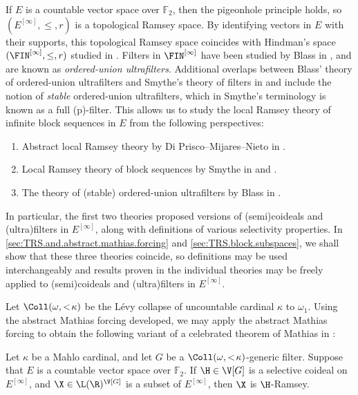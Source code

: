 \documentclass[11pt,reqno]{amsart}
\begin{document}
If $E$ is a countable vector space over $\mathbb{F}_2$, then the pigeonhole principle holds, so $(E^{[\infty]},\leq,r)$ is a topological Ramsey space. By identifying vectors in $E$ with their supports, this topological Ramsey space coincides with Hindman's space $(\FIN^{[\infty]},\leq,r)$ studied in \cite{B87}. Filters in $\FIN^{[\infty]}$ have been studied by Blass in \cite{B87}, and are known as \emph{ordered-union ultrafilters}. Additional overlaps between Blass' theory of ordered-union ultrafilters and Smythe's theory of filters in \cite{S18} and \cite{S23} include the notion of \emph{stable} ordered-union ultrafilters, which in Smythe's terminology is known as a full (p)-filter. This allows us to study the local Ramsey theory of infinite block sequences in $E$ from the following perspectives:
\begin{enumerate}
    \item Abstract local Ramsey theory by Di Prisco--Mijares--Nieto in \cite{DMN15}.
    
    \item Local Ramsey theory of block sequences by Smythe in \cite{S18} and \cite{S23}.
    
    \item The theory of (stable) ordered-union ultrafilters by Blass in \cite{B87}.
\end{enumerate}
In particular, the first two theories proposed versions of (semi)coideals and (ultra)filters in $E^{[\infty]}$, along with definitions of various selectivity properties. In \Sec\ref{sec:TRS.and.abstract.mathias.forcing} and \Sec\ref{sec:TRS.block.subspaces}, we shall show that these three theories coincide, so definitions may be used interchangeably and results proven in the individual theories may be freely applied to (semi)coideals and (ultra)filters in $E^{[\infty]}$.

Let $\Coll(\omega,<\!\kappa)$ be the L\'{e}vy collapse of uncountable cardinal $\kappa$ to $\omega_1$. Using the abstract Mathias forcing developed, we may apply the abstract Mathias forcing to obtain the following variant of a celebrated theorem of Mathias in \cite{M77}:
\begin{theorem}
\label{thm:mathias.thm.vector.spaces}
    Let $\kappa$ be a Mahlo cardinal, and let $G$ be a $\Coll(\omega,<\!\kappa)$-generic filter. Suppose that $E$ is a countable vector space over $\mathbb{F}_2$. If $\H \in \V[G]$ is a selective coideal on $E^{[\infty]}$, and $\X \in \L(\R)^{\V[G]}$ is a subset of $E^{[\infty]}$, then $\X$ is $\H$-Ramsey.
\end{theorem}
\end{document}
